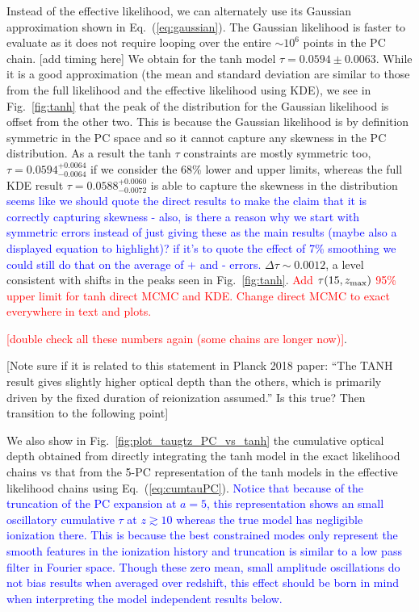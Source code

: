 \documentclass[prd,twocolumn,amsmath,amssymb,floatfix,superscriptaddress,nofootinbib]{revtex4-1}
\newcommand{\zmax}{z_{\rm max}}
\newcommand{\wh}[1]{\textcolor{blue}{#1}}
\newcommand{\ch}[1]{\textcolor{red}{#1}}
\begin{document}
Instead of the effective likelihood, we can alternately use its Gaussian approximation shown in Eq.~(\ref{eq:gaussian}). The Gaussian likelihood is faster to evaluate as it does not require looping over the entire $\sim 10^6$ points in the PC chain. [add timing here]
We obtain for the tanh model $\tau = 0.0594 \pm 0.0063$. While it is a good approximation (the mean and standard deviation are similar to those from the full likelihood and the effective likelihood using KDE), we see in Fig.~\ref{fig:tanh} that the peak of the distribution for the Gaussian likelihood is offset from the other two. This is because the Gaussian likelihood is by definition symmetric in the PC space and so it cannot capture any skewness in the PC distribution. As a result the tanh $\tau$ constraints are mostly symmetric too, $\tau = 0.0594_{-0.0064}^{+0.0064}$ if we consider the 68\% lower and upper limits, whereas the full KDE result $\tau = 0.0588_{-0.0072}^{+0.0060}$ is able to capture the skewness in the distribution
\wh{seems like we should quote the direct results to make the claim that it is correctly capturing skewness - also,  is there a reason why we start with symmetric errors instead of just giving these as the main results (maybe also a displayed equation to highlight)? if it's to quote the effect of 7\% smoothing we could still do that on the average of + and - errors.}
$\Delta \tau \sim 0.0012$, a level consistent with shifts in the peaks seen in Fig.~\ref{fig:tanh}. \ch{Add $\tau(15,\zmax)$ 95\% upper limit for tanh direct MCMC and KDE.} \ch{Change direct MCMC to exact everywhere in text and plots.}

\ch{[double check all these numbers again (some chains are longer now)]}.


[Note sure if it is related to this statement in Planck 2018 paper: ``The TANH result gives slightly higher optical  depth  than  the  others,  which  is  primarily driven  by  the  fixed  duration  of  reionization assumed.” Is this true? Then transition to the following point]

We also show in Fig.~\ref{fig:plot_taugtz_PC_vs_tanh} the cumulative optical depth obtained from directly integrating the tanh model in the exact likelihood chains vs that from the 5-PC representation of the tanh models in the effective likelihood chains using Eq.~(\ref{eq:cumtauPC}).
\wh{
Notice that because of the truncation of the PC expansion at $a=5$, this representation shows an small oscillatory cumulative $\tau$ at $z \gtrsim 10$ whereas the true model has negligible ionization there.   This is because the best constrained modes only represent the smooth features in the ionization history and truncation is similar to a low pass filter in Fourier space.  Though these zero mean, small amplitude oscillations do not bias results when averaged over redshift, this effect should be born in mind when interpreting the model independent results below.  
}
\end{document}
